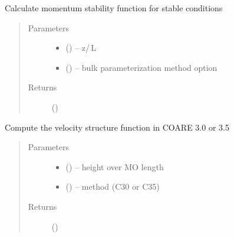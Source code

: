 \documentclass[letterpaper,10pt,english]{sphinxmanual}
\begin{document}
\begin{fulllineitems}
\label{\detokenize{index:flux_subs.psim_stab}}
Calculate momentum stability function for stable conditions
\begin{quote}\begin{description}
\item[{Parameters}] \leavevmode\begin{itemize}
\item {} 
 (\href{https://docs.python.org/3/library/functions.html\#float}{}) -- z\slash\,L

\item {} 
 (\href{https://docs.python.org/3/library/stdtypes.html\#str}{}) -- bulk parameterization method option 
\end{itemize}

\item[{Returns}] \leavevmode
{} (\href{https://docs.python.org/3/library/functions.html\#float}{})

\end{description}\end{quote}

\end{fulllineitems}


\begin{fulllineitems}
\label{\detokenize{index:flux_subs.psiu_26}}
Compute the velocity structure function in COARE 3.0 or 3.5
\begin{quote}\begin{description}
\item[{Parameters}] \leavevmode\begin{itemize}
\item {} 
 (\href{https://docs.python.org/3/library/functions.html\#float}{}) -- height over MO length

\item {} 
 (\href{https://docs.python.org/3/library/functions.html\#float}{}) -- method (C30 or C35)
\end{itemize}

\item[{Returns}] \leavevmode
{} (\href{https://docs.python.org/3/library/functions.html\#float}{})

\end{description}\end{quote}

\end{fulllineitems}
\end{document}
